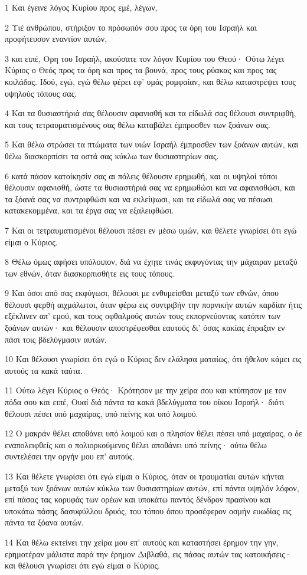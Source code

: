 \par 1 Και έγεινε λόγος Κυρίου προς εμέ, λέγων,
\par 2 Υιέ ανθρώπου, στήριξον το πρόσωπόν σου προς τα όρη του Ισραήλ και προφήτευσον εναντίον αυτών,
\par 3 και ειπέ, Ορη του Ισραήλ, ακούσατε τον λόγον Κυρίου του Θεού· Ούτω λέγει Κύριος ο Θεός προς τα όρη και προς τα βουνά, προς τους ρύακας και προς τας κοιλάδας. Ιδού, εγώ, εγώ θέλω φέρει εφ' υμάς ρομφαίαν, και θέλω καταστρέψει τους υψηλούς τόπους σας.
\par 4 Και τα θυσιαστήριά σας θέλουσιν αφανισθή και τα είδωλά σας θέλουσι συντριφθή, και τους τετραυματισμένους σας θέλω καταβάλει έμπροσθεν των ξοάνων σας.
\par 5 Και θέλω στρώσει τα πτώματα των υιών Ισραήλ έμπροσθεν των ξοάνων αυτών, και θέλω διασκορπίσει τα οστά σας κύκλω των θυσιαστηρίων σας.
\par 6 κατά πάσαν κατοίκησίν σας αι πόλεις θέλουσιν ερημωθή, και οι υψηλοί τόποι θέλουσιν αφανισθή, ώστε τα θυσιαστήριά σας να ερημωθώσι και να αφανισθώσι, και τα ξόανά σας να συντριφθώσι και να εκλείψωσι, και τα είδωλά σας να πέσωσι κατακεκομμένα, και τα έργα σας να εξαλειφθώσι.
\par 7 Και οι τετραυματισμένοι θέλουσι πέσει εν μέσω υμών, και θέλετε γνωρίσει ότι εγώ είμαι ο Κύριος.
\par 8 Θέλω όμως αφήσει υπόλοιπον, διά να έχητε τινάς εκφυγόντας την μάχαιραν μεταξύ των εθνών, όταν διασκορπισθήτε εις τους τόπους.
\par 9 Και όσοι από σας εκφύγωσι, θέλουσι με ενθυμείσθαι μεταξύ των εθνών, όπου θέλουσι φερθή αιχμάλωτοι, όταν φέρω εις συντριβήν την πορνικήν αυτών καρδίαν ήτις εξέκλινεν απ' εμού, και τους οφθαλμούς αυτών τους εκπορνεύοντας κατόπιν των ξοάνων αυτών· και θέλουσιν αποστρέφεσθαι εαυτούς δι' όσας κακίας έπραξαν εν πάσι τοις βδελύγμασιν αυτών.
\par 10 Και θέλουσι γνωρίσει ότι εγώ ο Κύριος δεν ελάλησα ματαίως, ότι ήθελον κάμει εις αυτούς τα κακά ταύτα.
\par 11 Ούτω λέγει Κύριος ο Θεός· Κρότησον με την χείρα σου και κτύπησον με τον πόδα σου και ειπέ, Ουαί διά πάντα τα κακά βδελύγματα του οίκου Ισραήλ· διότι θέλουσι πέσει υπό μαχαίρας, υπό πείνης και υπό λοιμού.
\par 12 Ο μακράν θέλει αποθάνει υπό λοιμού και ο πλησίον θέλει πέσει υπό μαχαίρας, ο δε εναπολειφθείς και ο πολιορκούμενος θέλει αποθάνει υπό πείνης· ούτω θέλω συντελέσει την οργήν μου επ' αυτούς.
\par 13 Και θέλετε γνωρίσει ότι εγώ είμαι ο Κύριος, όταν οι τραυματίαι αυτών κήνται μεταξύ των ξοάνων αυτών κύκλω των θυσιαστηρίων αυτών, επί πάντα υψηλόν λόφον, επί πάσας τας κορυφάς των ορέων και υποκάτω παντός δένδρον πρασίνου και υποκάτω πάσης δασυφύλλου δρυός, του τόπου όπου προσέφερον οσμήν ευωδίας εις πάντα τα ξόανα αυτών.
\par 14 Και θέλω εκτείνει την χείρα μου επ' αυτούς και καταστήσει έρημον την γην, ερημοτέραν μάλιστα παρά την έρημον Διβλαθά, εις πάσας αυτών τας κατοικήσεις· και θέλουσι γνωρίσει ότι εγώ είμαι ο Κύριος.

